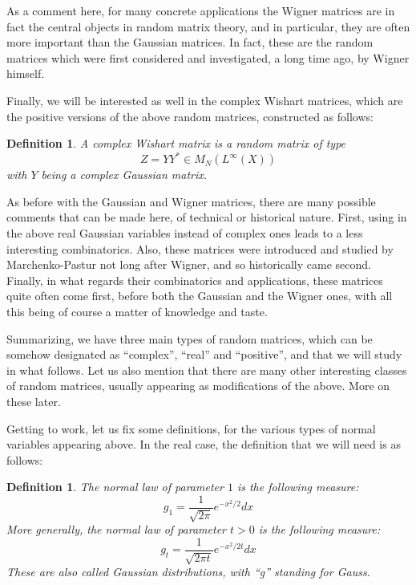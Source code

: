\documentclass[12pt]{amsbook}
\newtheorem{definition}[theorem]{Definition}
\begin{document}
As a comment here, for many concrete applications the Wigner matrices are in fact the central objects in random matrix theory, and in particular, they are often more important than the Gaussian matrices. In fact, these are the random matrices which were first considered and investigated, a long time ago, by Wigner himself.

\bigskip

Finally, we will be interested as well in the complex Wishart matrices, which are the positive versions of the above random matrices, constructed as follows: 

\begin{definition}
A complex Wishart matrix is a random matrix of type
$$Z=YY^*\in M_N(L^\infty(X))$$
with $Y$ being a complex Gaussian matrix.
\end{definition}

As before with the Gaussian and Wigner matrices, there are many possible comments that can be made here, of technical or historical nature. First, using in the above real Gaussian variables instead of complex ones leads to a less interesting combinatorics. Also, these matrices were introduced and studied by Marchenko-Pastur not long after Wigner, and so historically came second. Finally, in what regards their combinatorics and applications, these matrices quite often come first, before both the Gaussian and the Wigner ones, with all this being of course a matter of knowledge and taste.

\bigskip

Summarizing, we have three main types of random matrices, which can be somehow designated as ``complex'', ``real'' and ``positive'', and that we will study in what follows. Let us also mention that there are many other interesting classes of random matrices, usually appearing as modifications of the above. More on these later.

\bigskip

Getting to work, let us fix some definitions, for the various types of normal variables appearing above. In the real case, the definition that we will need is as follows:

\begin{definition}
The normal law of parameter $1$ is the following measure:
$$g_1=\frac{1}{\sqrt{2\pi}}e^{-x^2/2}dx$$
More generally, the normal law of parameter $t>0$ is the following measure:
$$g_t=\frac{1}{\sqrt{2\pi t}}e^{-x^2/2t}dx$$
These are also called Gaussian distributions, with ``g'' standing for Gauss.
\end{definition}
\end{document}
